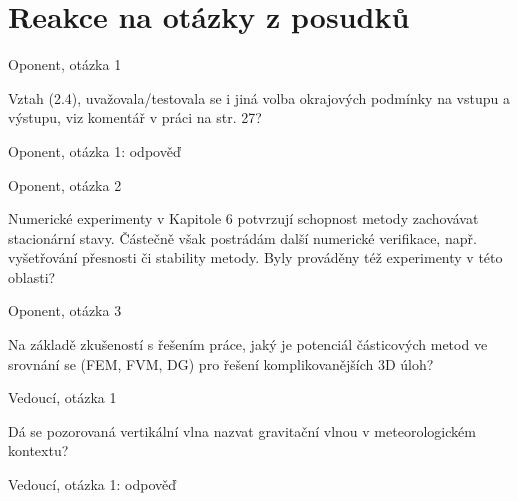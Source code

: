 \documentclass[10pt, aspectratio=169, t]{beamer}
\begin{document}
\section{Reakce na otázky z posudků}
\label{sec:RESPONSES}

\begin{qaframe}{Oponent, otázka 1}
	\begin{question}
		Vztah (2.4), uvažovala/testovala se i jiná volba okrajových podmínky na vstupu a výstupu, viz komentář v práci na str. 27?
	\end{question}
\end{qaframe}

\begin{qaframe}{Oponent, otázka 1: odpověď}
\end{qaframe}

\begin{qaframe}{Oponent, otázka 2}
	\begin{question}
		Numerické experimenty v Kapitole 6 potvrzují schopnost metody zachovávat stacionární stavy. Částečně však postrádám další numerické verifikace, např. vyšetřování přesnosti či stability metody. Byly prováděny též experimenty v této oblasti?
	\end{question}

\end{qaframe}

\begin{qaframe}{Oponent, otázka 3}
	\begin{question}
		Na základě zkušeností s řešením práce, jaký je potenciál částicových metod ve srovnání se  (FEM, FVM, DG) pro řešení komplikovanějších 3D úloh?
	\end{question}
\end{qaframe}

\begin{qaframe}{Vedoucí, otázka 1}
	\begin{question}
		Dá se pozorovaná vertikální vlna nazvat gravitační vlnou v meteorologickém kontextu?
	\end{question}
\end{qaframe}

\begin{qaframe}{Vedoucí, otázka 1: odpověď}
\end{qaframe}
\end{document}
